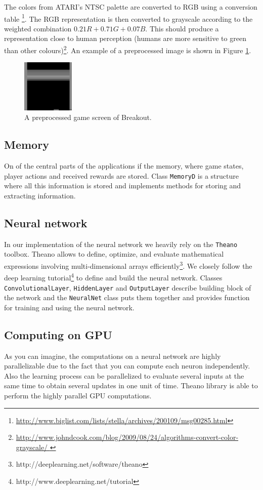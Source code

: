 \documentclass[a4paper,12pt]{article}
\begin{document}
The colors from ATARI's NTSC palette are converted to RGB using a conversion table
\footnote{\url{http://www.biglist.com/lists/stella/archives/200109/msg00285.html}}. The RGB representation is then converted to grayscale according to the weighted combination $0.21R + 0.71G + 0.07B$. This should produce a representation close to human perception (humans are more sensitive to green than other colours)\footnote{\url{http://www.johndcook.com/blog/2009/08/24/algorithms-convert-color-grayscale/
}}. An example of a preprocessed image is shown in Figure \ref{fig:breakoutpreprocessed}.

\begin{figure}[h]
\centering
\includegraphics[width=2.5cm]{images/fig_preprocessedscreen.png}
\caption{A preprocessed game screen of Breakout.}
\label{fig:breakoutpreprocessed}
\end{figure}


\subsection{Memory}
On of the central parts of the applications if the memory, where game states, player actions and received rewards are stored. Class \texttt{MemoryD} is a structure where all this information is stored and implements methods for storing and extracting information.


\subsection{Neural network}
In our implementation of the neural network we heavily rely on the \texttt{Theano} toolbox. Theano allows to define, optimize, and evaluate mathematical expressions involving multi-dimensional arrays efficiently\footnote{http://deeplearning.net/software/theano}. We closely follow the deep learning tutorial\footnote{http://www.deeplearning.net/tutorial} to define and build the neural network. Classes \texttt{ConvolutionalLayer}, \texttt{HiddenLayer} and \texttt{OutputLayer} describe building block of the network and the \texttt{NeuralNet} class puts them together and provides function for training and using the neural network.

\subsection{Computing on GPU}
As you can imagine, the computations on a neural network are highly parallelizable due to the fact that you can compute each neuron independently. Also the learning process can be parallelized to evaluate several inputs at the same time to obtain several updates in one unit of time. Theano library is able to perform the highly parallel GPU computations.
\end{document}
